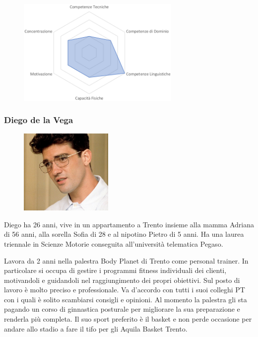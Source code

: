 \documentclass[12pt,italian,]{report}
\begin{document}
\begin{figure}[h]
\centering
\includegraphics[width=0.7\textwidth,height=\textheight]{img/antonio_competenze.png}
\end{figure}

\newpage
\hypertarget{diego-de-la-vega-1}{%
\subsubsection{Diego de la Vega}\label{diego-de-la-vega-1}}


\begin{figure}[h]
\centering
\includegraphics[width=0.4\textwidth,height=\textheight]{img/diego.jpg}
\end{figure}


Diego ha 26 anni, vive in un appartamento a Trento insieme alla mamma
Adriana di 56 anni, alla sorella Sofia di 28 e al nipotino Pietro di 5
anni. Ha una laurea triennale in Scienze Motorie conseguita
all'università telematica Pegaso.

Lavora da 2 anni nella palestra Body Planet di Trento come personal
trainer. In particolare si occupa di gestire i programmi fitness
individuali dei clienti, motivandoli e guidandoli nel raggiungimento dei
propri obiettivi. Sul posto di lavoro è molto preciso e professionale.
Va d'accordo con tutti i suoi colleghi PT con i quali è solito
scambiarsi consigli e opinioni. Al momento la palestra gli sta pagando
un corso di ginnastica posturale per migliorare la sua preparazione e
renderla più completa. Il suo sport preferito è il basket e non perde
occasione per andare allo stadio a fare il tifo per gli Aquila Basket
Trento.
\end{document}

